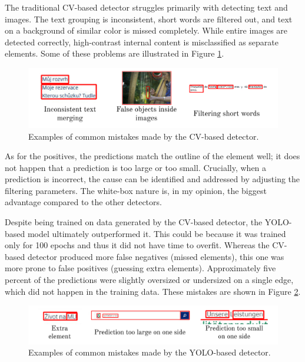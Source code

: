 \documentclass[
  digital,     %
  oneside,     %
  nosansbold,  %
  nocolorbold, %
  lof,         %
  lot,         %
]{fithesis4}
\begin{document}
The traditional CV-based detector struggles primarily with detecting text and images. The text grouping is inconsistent, short words are filtered out, and text on a background of similar color is missed completely. While entire images are detected correctly, high-contrast internal content is misclassified as separate elements. Some of these problems are illustrated in Figure \ref{fig:cv-mistakes}.

\begin{figure}
    \centering
    \includegraphics[width=1\linewidth]{diagrams/cv_mistakes.pdf}
    \caption{Examples of common mistakes made by the CV-based detector.}
    \label{fig:cv-mistakes}
\end{figure}

As for the positives, the predictions match the outline of the element well; it does not happen that a prediction is too large or too small. Crucially, when a prediction is incorrect, the cause can be identified and addressed by adjusting the filtering parameters. The white-box nature is, in my opinion, the biggest advantage compared to the other detectors.

Despite being trained on data generated by the CV-based detector, the YOLO-based model ultimately outperformed it. This could be because it was trained only for 100 epochs and thus it did not have time to overfit. Whereas the CV-based detector produced more false negatives (missed elements), this one was more prone to false positives (guessing extra elements). Approximately five percent of the predictions were slightly oversized or undersized on a single edge, which did not happen in the training data. These mistakes are shown in Figure \ref{fig:yolo-mistakes}.

\begin{figure}
    \centering
    \includegraphics[width=1\linewidth]{diagrams/yolo_mistakes.pdf}
    \caption{Examples of common mistakes made by the YOLO-based detector.}
    \label{fig:yolo-mistakes}
\end{figure}
\end{document}
